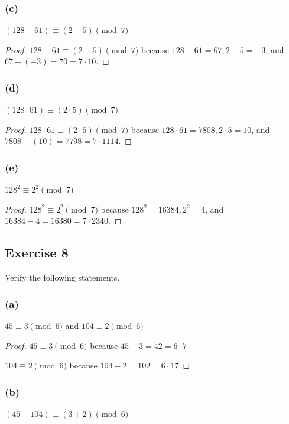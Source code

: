 \documentclass[14pt]{extarticle}
\begin{document}
\subsubsection{(c)}
\((128 - 61) \equiv (2 - 5) \pmod 7\)

\begin{proof}
        \(128 - 61 \equiv (2 - 5) \pmod 7\) because \(128 - 61 = 67, 2 - 5 = -3\), and \(67 - (-3) = 70 = 7 \cdot 10\).
\end{proof}

\subsubsection{(d)}
\((128 \cdot 61) \equiv (2 \cdot 5) \pmod 7\)

\begin{proof}
        \(128 \cdot 61 \equiv (2 \cdot 5) \pmod 7\) because \(128 \cdot 61 = 7808, 2 \cdot 5 = 10\), and \(7808 - (10) = 7798
        = 7 \cdot 1114\).
\end{proof}

\subsubsection{(e)}
\(128^2 \equiv 2^2 \pmod 7\)

\begin{proof}
        \(128^2 \equiv 2^2 \pmod 7\) because \(128^2 = 16384, 2^2 = 4\), and \(16384 - 4 = 16380 = 7 \cdot 2340\).
\end{proof}

\subsection{Exercise 8}
Verify the following statements.

\subsubsection{(a)}
\(45 \equiv 3 \pmod 6\) and \(104 \equiv 2 \pmod 6\)

\begin{proof}
        \(45 \equiv 3 \pmod 6\) because \(45 - 3 = 42 = 6 \cdot 7\)

        \(104 \equiv 2 \pmod 6\) because \(104 - 2 = 102 = 6 \cdot 17\)
\end{proof}

\subsubsection{(b)}
\((45 + 104) \equiv (3 + 2) \pmod 6\)
\end{document}

